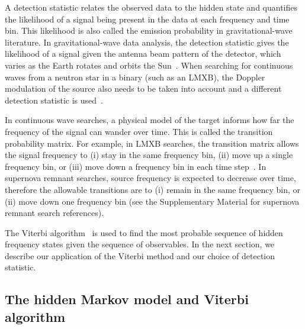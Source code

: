 \documentclass[paper-main.tex]{subfiles}
\begin{document}
A detection statistic relates the observed data to the hidden state and quantifies the likelihood of a signal being present in the data at each frequency and time bin.
This likelihood is also called the emission probability in gravitational-wave literature.  
In gravitational-wave data analysis, the detection statistic gives the likelihood of a signal given the antenna beam pattern of the detector, which varies as the Earth rotates and orbits the Sun~\cite{JKS:1998}.
When searching for continuous waves from a neutron star in a binary (such as an LMXB), the Doppler modulation of the source also needs to be taken into account and a different detection statistic is used~\cite{SuvorovaEtAl:2017}. 


In continuous wave searches, a physical model of the target informs how far the frequency of the signal can wander over time. 
This is called the transition probability matrix. 
For example, in LMXB searches, the transition matrix allows the signal frequency to (i) stay in the same frequency bin, (ii) move up a single frequency bin, or (iii) move down a frequency bin in each time step~\cite{ScoX1O2Viterbi:2019}. 
In supernova remnant searches, source frequency is expected to decrease over time, therefore the allowable transitions are to (i) remain in the same frequency bin, or (ii) move down one frequency bin (see the Supplementary Material for supernova remnant search references). 


The Viterbi algorithm~\cite{Viterbi:1967} is used to find the most probable sequence of hidden frequency states given the sequence of observables.
In the next section, we describe our application of the Viterbi method and our choice of detection statistic. 




\subsection{The hidden Markov model and Viterbi algorithm}
\label{sec:viterbi}
\end{document}
